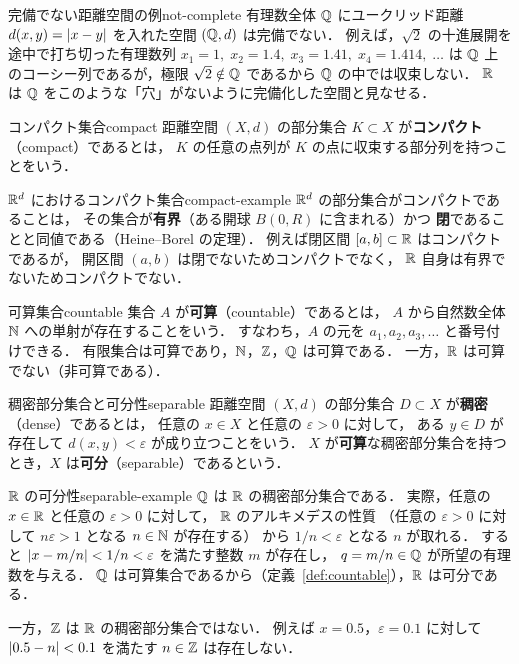 \begin{remark}{完備でない距離空間の例}{not-complete}
  有理数全体 $\mathbb{Q}$ にユークリッド距離 $d(x,y) = \lvert x - y \rvert$ を入れた空間 $(\mathbb{Q}, d)$ は完備でない．
  例えば，$\sqrt{2}$ の十進展開を途中で打ち切った有理数列
  $x_1 = 1,\; x_2 = 1.4,\; x_3 = 1.41,\; x_4 = 1.414,\; \ldots$
  は $\mathbb{Q}$ 上のコーシー列であるが，極限 $\sqrt{2} \notin \mathbb{Q}$ であるから
  $\mathbb{Q}$ の中では収束しない．
  $\mathbb{R}$ は $\mathbb{Q}$ をこのような「穴」がないように完備化した空間と見なせる．
\end{remark}

\begin{definition}{コンパクト集合}{compact}
  距離空間 $(X, d)$ の部分集合 $K \subset X$ が\textbf{コンパクト}（compact）であるとは，
  $K$ の任意の点列が $K$ の点に収束する部分列を持つことをいう．
\end{definition}

\begin{example}{$\mathbb{R}^d$ におけるコンパクト集合}{compact-example}
  $\mathbb{R}^d$ の部分集合がコンパクトであることは，
  その集合が\textbf{有界}（ある開球 $B(0, R)$ に含まれる）かつ
  \textbf{閉}であることと同値である（Heine--Borel の定理）．
  例えば閉区間 $[a, b] \subset \mathbb{R}$ はコンパクトであるが，
  開区間 $(a, b)$ は閉でないためコンパクトでなく，
  $\mathbb{R}$ 自身は有界でないためコンパクトでない．
\end{example}

\begin{definition}{可算集合}{countable}
  集合 $A$ が\textbf{可算}（countable）であるとは，
  $A$ から自然数全体 $\mathbb{N}$ への単射が存在することをいう．
  すなわち，$A$ の元を $a_1, a_2, a_3, \ldots$ と番号付けできる．
  有限集合は可算であり，$\mathbb{N}$，$\mathbb{Z}$，$\mathbb{Q}$ は可算である．
  一方，$\mathbb{R}$ は可算でない（非可算である）．
\end{definition}

\begin{definition}{稠密部分集合と可分性}{separable}
  距離空間 $(X, d)$ の部分集合 $D \subset X$ が\textbf{稠密}（dense）であるとは，
  任意の $x \in X$ と任意の $\varepsilon > 0$ に対して，
  ある $y \in D$ が存在して $d(x, y) < \varepsilon$ が成り立つことをいう．
  $X$ が\textbf{可算}な稠密部分集合を持つとき，$X$ は\textbf{可分}（separable）であるという．
\end{definition}

\begin{example}{$\mathbb{R}$ の可分性}{separable-example}
  $\mathbb{Q}$ は $\mathbb{R}$ の稠密部分集合である．
  実際，任意の $x \in \mathbb{R}$ と任意の $\varepsilon > 0$ に対して，
  $\mathbb{R}$ のアルキメデスの性質
  （任意の $\varepsilon > 0$ に対して $n\varepsilon > 1$ となる $n \in \mathbb{N}$ が存在する）
  から $1/n < \varepsilon$ となる $n$ が取れる．
  すると $\lvert x - m/n \rvert < 1/n < \varepsilon$ を満たす整数 $m$ が存在し，
  $q = m/n \in \mathbb{Q}$ が所望の有理数を与える．
  $\mathbb{Q}$ は可算集合であるから（定義~\ref{def:countable}），$\mathbb{R}$ は可分である．

  一方，$\mathbb{Z}$ は $\mathbb{R}$ の稠密部分集合ではない．
  例えば $x = 0.5$，$\varepsilon = 0.1$ に対して
  $\lvert 0.5 - n \rvert < 0.1$ を満たす $n \in \mathbb{Z}$ は存在しない．
\end{example}

